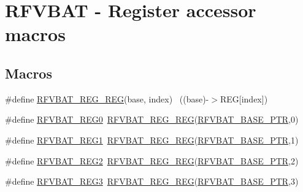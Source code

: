\hypertarget{group___r_f_v_b_a_t___register___accessor___macros}{}\section{R\+F\+V\+B\+AT -\/ Register accessor macros}
\label{group___r_f_v_b_a_t___register___accessor___macros}
\subsection*{Macros}
\begin{DoxyCompactItemize}
\item 
\#define \hyperlink{group___r_f_v_b_a_t___register___accessor___macros_ga8c8b6cb4ceddcf6be9717e473a265aba}{R\+F\+V\+B\+A\+T\+\_\+\+R\+E\+G\+\_\+\+R\+EG}(base,  index)                          ~((base)-\/$>$R\+EG\mbox{[}index\mbox{]})
\item 
\#define \hyperlink{group___r_f_v_b_a_t___register___accessor___macros_gab2c2deaa663210dcbe5b3c7c9dd3c279}{R\+F\+V\+B\+A\+T\+\_\+\+R\+E\+G0}~\hyperlink{group___r_f_v_b_a_t___register___accessor___macros_ga8c8b6cb4ceddcf6be9717e473a265aba}{R\+F\+V\+B\+A\+T\+\_\+\+R\+E\+G\+\_\+\+R\+EG}(\hyperlink{group___r_f_v_b_a_t___peripheral_ga5b6418d9be20f84b2190ccf6134b7ba3}{R\+F\+V\+B\+A\+T\+\_\+\+B\+A\+S\+E\+\_\+\+P\+TR},0)
\item 
\#define \hyperlink{group___r_f_v_b_a_t___register___accessor___macros_gaad1d344fc43c23927596453cbbfbe87f}{R\+F\+V\+B\+A\+T\+\_\+\+R\+E\+G1}~\hyperlink{group___r_f_v_b_a_t___register___accessor___macros_ga8c8b6cb4ceddcf6be9717e473a265aba}{R\+F\+V\+B\+A\+T\+\_\+\+R\+E\+G\+\_\+\+R\+EG}(\hyperlink{group___r_f_v_b_a_t___peripheral_ga5b6418d9be20f84b2190ccf6134b7ba3}{R\+F\+V\+B\+A\+T\+\_\+\+B\+A\+S\+E\+\_\+\+P\+TR},1)
\item 
\#define \hyperlink{group___r_f_v_b_a_t___register___accessor___macros_ga2cb98ee1f823c18c81f270beb24b359a}{R\+F\+V\+B\+A\+T\+\_\+\+R\+E\+G2}~\hyperlink{group___r_f_v_b_a_t___register___accessor___macros_ga8c8b6cb4ceddcf6be9717e473a265aba}{R\+F\+V\+B\+A\+T\+\_\+\+R\+E\+G\+\_\+\+R\+EG}(\hyperlink{group___r_f_v_b_a_t___peripheral_ga5b6418d9be20f84b2190ccf6134b7ba3}{R\+F\+V\+B\+A\+T\+\_\+\+B\+A\+S\+E\+\_\+\+P\+TR},2)
\item 
\#define \hyperlink{group___r_f_v_b_a_t___register___accessor___macros_ga7d8455bad7fb104b0a327253883e0df9}{R\+F\+V\+B\+A\+T\+\_\+\+R\+E\+G3}~\hyperlink{group___r_f_v_b_a_t___register___accessor___macros_ga8c8b6cb4ceddcf6be9717e473a265aba}{R\+F\+V\+B\+A\+T\+\_\+\+R\+E\+G\+\_\+\+R\+EG}(\hyperlink{group___r_f_v_b_a_t___peripheral_ga5b6418d9be20f84b2190ccf6134b7ba3}{R\+F\+V\+B\+A\+T\+\_\+\+B\+A\+S\+E\+\_\+\+P\+TR},3)

\end{DoxyCompactItemize}
